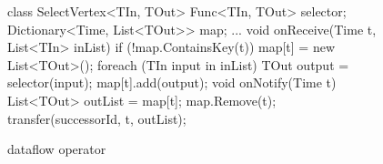 \begin{figure}[t!]
\begin{numcodejava}
class SelectVertex<TIn, TOut> {
  Func<TIn, TOut> selector;
  Dictionary<Time, List<TOut>> map;
  ...
  void onReceive(Time t, List<TIn> inList) {
    if (!map.ContainsKey(t)) map[t] = new List<TOut>();
    foreach (TIn input in inList) {
      TOut output = selector(input);
      map[t].add(output); } }
  void onNotify(Time t) {
     List<TOut> outList = map[t];
     map.Remove(t);
     transfer(successorId, t, outList); }
}
\end{numcodejava}
\caption{ dataflow operator}
\label{fig:motivating-eg}
\vspace*{-0.2in}
\end{figure}
